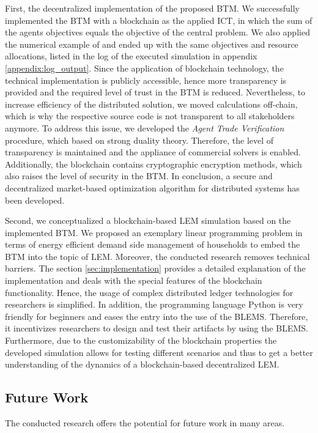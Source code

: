 First, the decentralized implementation of the proposed BTM. 
We successfully implemented the BTM with a blockchain as the applied ICT, 
in which the sum of the agents objectives equals the objective of the central problem. 
We also applied the numerical example of  and 
ended up with the same objectives and resource allocations, listed in the log 
of the executed simulation in appendix \ref{appendix:log_output}.
Since the application of blockchain technology, the technical implementation
is publicly accessible, hence more transparency is provided and the 
required level of trust in the BTM is reduced. 
Nevertheless, to increase efficiency of the distributed solution,
we moved calculations off-chain, which is why the respective source code 
is not transparent to all stakeholders anymore.
To address this issue, we developed the \textit{Agent Trade Verification} procedure,
which based on strong duality theory.
Therefore, the level of transparency is maintained and
the appliance of commercial solvers is enabled. 
Additionally, the blockchain contains cryptographic encryption methods,
which also raises the level of security in the BTM.
In conclusion, a secure and decentralized market-based optimization algorithm for distributed systems has 
been developed.

Second, we conceptualized a blockchain-based LEM simulation based on the implemented
BTM. We proposed an exemplary linear programming problem in terms of 
energy efficient demand side management of households to embed the BTM into the topic of LEM.
Moreover, the conducted research removes technical barriers.
The section \ref{sec:implementation} provides a detailed 
explanation of the implementation and deals with the special features 
of the blockchain functionality.
Hence, the usage of complex distributed ledger technologies for researchers
is simplified. 
In addition, the programming language Python is very 
friendly for beginners and eases the entry into the use of the BLEMS.
Therefore, it incentivizes researchers 
to design and test their artifacts by using the BLEMS.
Furthermore, due to the customizability of the blockchain properties 
the developed simulation allows for testing different scenarios and thus 
to get a better understanding of the dynamics of a blockchain-based decentralized LEM.

\subsection{Future Work}
The conducted research offers the potential for future work in many areas.

